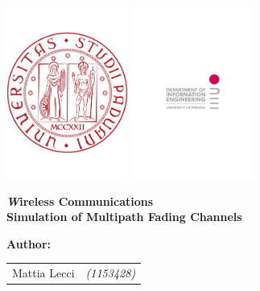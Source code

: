\begin{titlepage}
	
\centering
{\includegraphics[width=4cm]{img/logo_unipd}
\hspace{7cm}
\includegraphics[width=4cm]{img/logo_dei}
}

\vspace{2cm}
{\bfseries\Large\textit
	Wireless Communications\\
} 
{\bfseries\Huge
	Simulation of Multipath Fading Channels\\
}
\vspace{1cm}
{\large
	\textbf{Author:}
	
	\normalsize
	\begin{tabular}{ll}
		Mattia Lecci 	& {\footnotesize\textit{(1153428)}} \\ 
	\end{tabular} 
} 
\vfill



\end{titlepage}